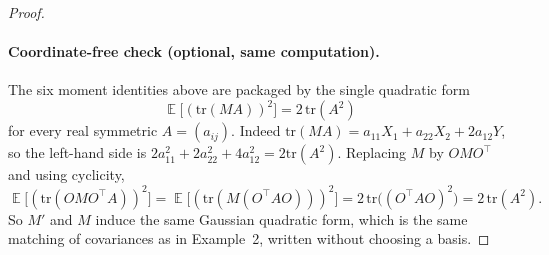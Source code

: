 \documentclass[11pt,a4paper]{article}
\DeclareMathOperator{\E}{\mathbb{E}}
\begin{document}
\begin{proof}
\paragraph{Coordinate-free check (optional, same computation).}
The six moment identities above are packaged by the single quadratic form
\begin{equation}
\label{eq:p6-quadratic}
\E\bigl[(\mathrm{tr}(MA))^2\bigr]
=
2\,\mathrm{tr}(A^2)
\end{equation}
for every real symmetric \(A=(a_{ij})\). Indeed \(\mathrm{tr}(MA)=a_{11}X_1+a_{22}X_2+2a_{12}Y\), so the left-hand side is \(2a_{11}^2+2a_{22}^2+4a_{12}^2=2\mathrm{tr}(A^2)\). Replacing \(M\) by \(OMO^\top\) and using cyclicity,
\[
\E\bigl[(\mathrm{tr}(OMO^\top A))^2\bigr]
=
\E\bigl[(\mathrm{tr}(M(O^\top AO)))^2\bigr]
=
2\,\mathrm{tr}\bigl((O^\top AO)^2\bigr)
=
2\,\mathrm{tr}(A^2).
\]
So \(M'\) and \(M\) induce the same Gaussian quadratic form, which is the same matching of covariances as in Example~2, written without choosing a basis.
\end{proof}
\end{document}
